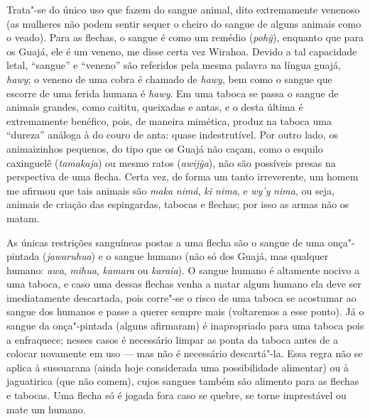 Trata"-se do único uso que fazem do sangue animal, dito extremamente
venenoso (as mulheres não podem sentir sequer o cheiro do sangue de
alguns animais como o veado). Para as flechas, o sangue é como um
remédio (\emph{pohỹ}), enquanto que para os Guajá, ele é um veneno, me
disse certa vez Wirahoa. Devido a tal capacidade letal, ``sangue'' e
``veneno'' são referidos pela mesma palavra na língua guajá, \emph{hawy};
o veneno de uma cobra é chamado de \emph{hawy}, bem como o sangue que
escorre de uma ferida humana é \emph{hawy}. Em uma taboca se passa o
sangue de animais grandes, como caititu, queixadas e antas, e o desta
última é extremamente benéfico, pois, de maneira mimética, produz na
taboca uma ``dureza'' análoga à do couro de anta: quase indestrutível. Por
outro lado, os animaizinhos pequenos, do tipo que os Guajá não caçam,
como o esquilo caxinguelê (\emph{tamakaja}) ou mesmo ratos
(\emph{awijỹa}), não são possíveis presas na perspectiva de uma flecha.
Certa vez, de forma um tanto irreverente, um homem me afirmou que tais
animais são \emph{maka} \emph{nimá}, \emph{kĩ nima}, e \emph{wy'y}
\emph{nima}, ou seja, animais de criação das espingardas, tabocas e
flechas; por isso as armas não os matam.

As únicas restrições sanguíneas postas a uma flecha são o sangue de uma
onça"-pintada (\emph{jawaruhua}) e o sangue humano (não só dos Guajá, mas
qualquer humano: \emph{awa}, \emph{mihua}, \emph{kamara} ou
\emph{karaia}). O sangue humano é altamente nocivo a uma taboca, e caso
uma dessas flechas venha a matar algum humano ela deve ser imediatamente
descartada, pois corre"-se o risco de uma taboca se acostumar ao sangue
dos humanos e passe a querer sempre mais (voltaremos a esse ponto). Já o
sangue da onça"-pintada (alguns afirmaram) é inapropriado para uma taboca
pois a enfraquece; nesses casos é necessário limpar as ponta da taboca
antes de a colocar novamente em uso --- mas não é necessário descartá"-la.
Essa regra não se aplica à sussuarana (ainda hoje considerada uma
possibilidade alimentar) ou à jaguatirica (que não comem), cujos sangues
também são alimento para as flechas e tabocas. Uma flecha só é jogada
fora caso se quebre, se torne imprestável ou mate um humano.

